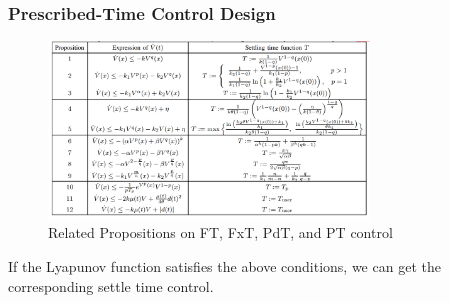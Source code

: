\begin{frame}
  \frametitle{\normalsize{Prescribed-Time Control Design}}\transwipe
  \begin{figure}
    \includegraphics[height=1.85in]{figure/game/3-ptcd.png}
    \vspace{6pt}
    \caption{ Related Propositions on FT, FxT, PdT, and PT control}
  \end{figure}
  \bremark
  If the Lyapunov function satisfies the above conditions, we can get the corresponding settle  time control.
  \eremark
  \end{frame}
